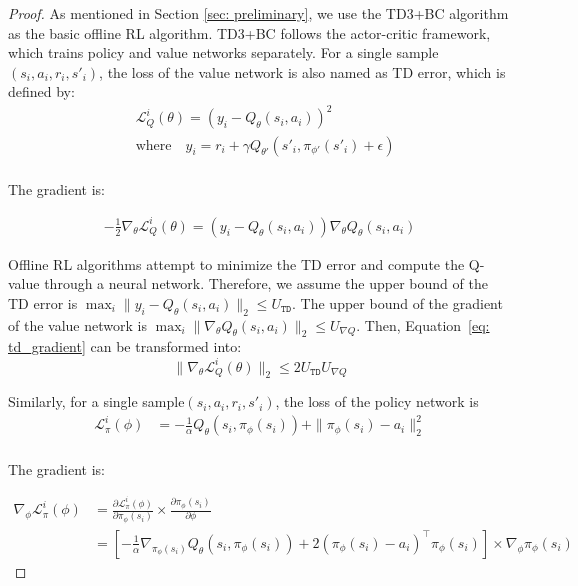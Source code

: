 \begin{proof}
As mentioned in Section \ref{sec: preliminary}, we use the TD3+BC algorithm as the basic offline RL algorithm. 
TD3+BC follows the actor-critic framework, which trains policy and value networks separately. 
For a single sample $(s_i,a_i,r_i,s'_i)$, the loss of the value network is also named as TD error, which is defined by:
\begin{align}
    & \mathcal L_{Q}^i(\theta) = (y_i - Q_\theta(s_i,a_i))^2   \\
    & \text{where}\quad y_i = r_i + \gamma Q_{\theta'}(s'_i,\pi_{\phi'}(s'_i)+\epsilon)  \\
\end{align}

The gradient is:

\begin{align}
    -\frac{1}{2} \nabla_{\theta} \mathcal L^i_Q(\theta)=(y_i- Q_\theta(s_i,a_i))\nabla_\theta Q_\theta(s_i,a_i)
    \label{eq: td_gradient}
\end{align}

Offline RL algorithms attempt to minimize the TD error and compute the Q-value through a neural network.
Therefore, we assume the upper bound of the TD error is $\max_i\|y_i- Q_\theta(s_i,a_i)\|_2\leq U_\mathtt{TD}$.
The upper bound of the gradient of the value network is $\max_i \|\nabla_\theta Q_\theta(s_i,a_i)\|_2\leq U_{\nabla Q}$.
Then, Equation~\ref{eq: td_gradient} can be transformed into:
\begin{equation}
    \|\nabla_\theta \mathcal L^i_Q(\theta)\|_2 \leq 2U_\mathtt{TD} U_{\nabla Q}
\end{equation}

Similarly, for a single sample$(s_i,a_i,r_i,s'_i)$, the loss of the policy network is
\begin{align}
    \mathcal L_{\pi}^i(\phi) &= -\frac{1}{\alpha} Q_\theta(s_i, \pi_{\phi}(s_i))+\|\pi_{\phi}(s_i)-a_i\|_2^2 \\
\end{align}

The gradient is:

\begin{align}
    \nabla_{\phi} \mathcal L_{\pi}^i(\phi) &= \frac{\partial \mathcal L_{\pi}^i(\phi)}{\partial \pi_{\phi}(s_i)}\times \frac{\partial \pi_{\phi}(s_i)}{\partial \phi}   \\
    &= [-\frac{1}{\alpha} \nabla_{\pi_{\phi}(s_i)}Q_\theta(s_i,\pi_{\phi}(s_i))+2(\pi_{\phi}(s_i)-a_i)^\top \pi_{\phi}(s_i)] \times \nabla_\phi \pi_{\phi}(s_i)
    \label{eq: policy_gradient}
\end{align}


\end{proof}
